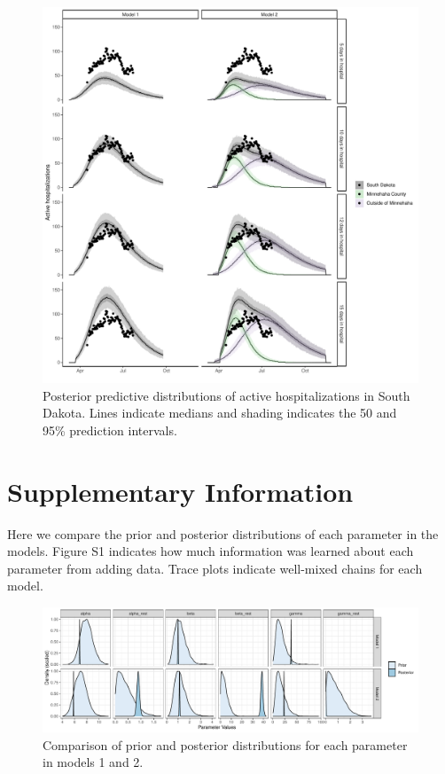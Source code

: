 \documentclass[
]{article}
\begin{document}
\begin{figure}
\centering
\includegraphics{manuscript_updates_after_submittingon7102020_files/figure-latex/unnamed-chunk-5-1.pdf}
\caption{\label{fig:unnamed-chunk-5}Posterior predictive distributions of active hospitalizations in South Dakota. Lines indicate medians and shading indicates the 50 and 95\% prediction intervals.\label{active_daily_group:plot}}
\end{figure}

\newpage

\FloatBarrier

\hypertarget{supplementary-information}{%
\section{Supplementary Information}\label{supplementary-information}}

Here we compare the prior and posterior distributions of each parameter in the models. Figure S1 indicates how much information was learned about each parameter from adding data. Trace plots indicate well-mixed chains for each model.

\begin{figure}
\centering
\includegraphics{manuscript_updates_after_submittingon7102020_files/figure-latex/unnamed-chunk-6-1.pdf}
\caption{\label{fig:unnamed-chunk-6}Comparison of prior and posterior distributions for each parameter in models 1 and 2.}
\end{figure}
\end{document}
